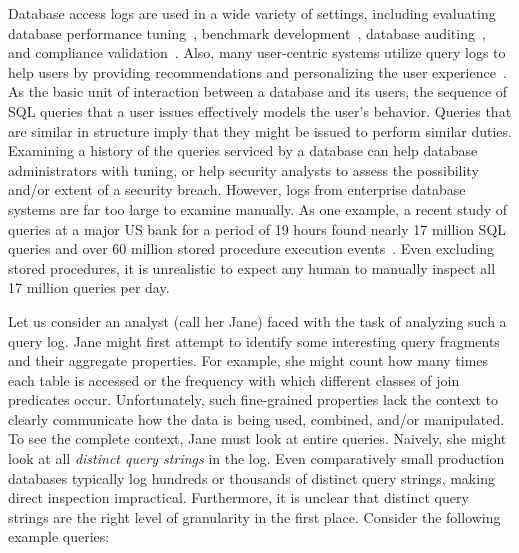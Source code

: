 Database access logs are used in a wide variety of settings, including evaluating database performance tuning~\cite{Bruno:2005:APD:1066157.1066184}, benchmark development~\cite{pocketdata}, database auditing~\cite{kul2016ettu}, and compliance validation~\cite{Dwork2006}.
Also, many user-centric systems utilize query logs to help users by providing recommendations and personalizing the user experience~\cite{Sapia:2000:PPQ:646109.679288, giacometti2009, yang2009, stefanidis2009you, magda2010snipsuggest, chatzopoulou2011querie}. 
As the basic unit of interaction between a database and its users, the sequence of SQL queries that a user issues effectively models the user's behavior.  Queries that are similar in structure imply that they might be issued to perform similar duties. Examining a history of the queries serviced by a database can help database administrators with tuning, or help security analysts to assess the possibility and/or extent of a security breach. However, logs from enterprise database systems are far too large to examine manually. As one example, a recent study of queries at a major US bank for a period of 19 hours found nearly 17 million SQL queries and over 60 million stored procedure execution events~\cite{kul2016ettu}. Even excluding stored procedures, it is unrealistic to expect any human to manually inspect all 17 million queries per day.

Let us consider an analyst (call her Jane) faced with the task of analyzing such a query log.
Jane might first attempt to identify some interesting query fragments and their aggregate properties.
For example, she might count how many times each table is accessed or the frequency with which different classes of join predicates occur. 
Unfortunately, such fine-grained properties lack the context to clearly communicate how the data is being used, combined, and/or manipulated. 
To see the complete context, Jane must look at entire queries.
Naively, she might look at all \textit{distinct query strings} in the log.
Even comparatively small production databases typically log hundreds or thousands of distinct query strings, making direct inspection impractical.
Furthermore, it is unclear that distinct query strings are the right level of granularity in the first place.  Consider the following example queries:

